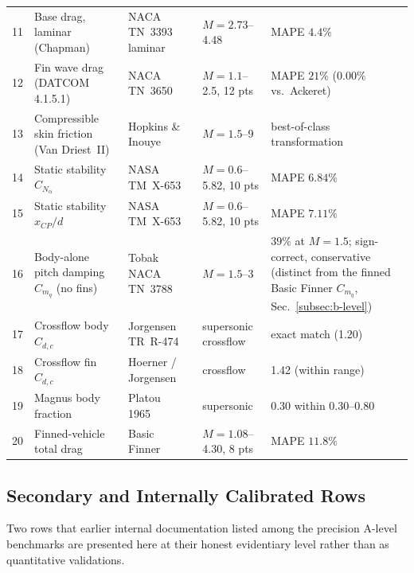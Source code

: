 \begin{table}[htbp]
\begin{tabular}{@{}r p{} p{} p{} p{}@{}}
11 & Base drag, laminar (Chapman)  & NACA TN~3393 laminar~\cite{chapman1955}           & $M = 2.73$--4.48           & MAPE $4.4\%$ \\
12 & Fin wave drag (DATCOM 4.1.5.1)& NACA TN~3650~\cite{ulmann1956}                    & $M = 1.1$--2.5, 12 pts     & MAPE $21\%$ ($0.00\%$ vs.\ Ackeret) \\
13 & Compressible skin friction (Van Driest~II) & Hopkins \& Inouye~\cite{hopkins1971} & $M = 1.5$--9        & best-of-class transformation \\
14 & Static stability $C_{N_\alpha}$ & NASA TM~X-653~\cite{nielsen1962}                & $M = 0.6$--5.82, 10 pts    & MAPE $6.84\%$ \\
15 & Static stability $x_{CP}/d$   & NASA TM~X-653~\cite{nielsen1962}                  & $M = 0.6$--5.82, 10 pts    & MAPE $7.11\%$ \\
16 & Body-alone pitch damping $C_{m_q}$ (no fins) & Tobak NACA TN~3788~\cite{tobak1956}               & $M = 1.5$--3               & $39\%$ at $M=1.5$; sign-correct, conservative (distinct from the finned Basic Finner $C_{m_q}$, Sec.~\ref{subsec:b-level}) \\
17 & Crossflow body $C_{d,c}$      & Jorgensen TR~R-474~\cite{jorgensen1977}           & supersonic crossflow       & exact match (1.20) \\
18 & Crossflow fin $C_{d,c}$       & Hoerner / Jorgensen~\cite{hoerner1965}            & crossflow                  & 1.42 (within range) \\
19 & Magnus body fraction          & Platou 1965~\cite{platou1965}                     & supersonic                 & 0.30 within $0.30$--$0.80$ \\
20 & Finned-vehicle total drag     & Basic Finner~\cite{dupuis1997}                    & $M = 1.08$--4.30, 8 pts    & MAPE $11.8\%$ \\
\bottomrule
\end{tabular}
\endgroup
\end{table}

\subsection{Secondary and Internally Calibrated Rows}
\label{subsec:secondary}

Two rows that earlier internal documentation listed among the precision A-level
benchmarks are presented here at their honest evidentiary level rather than as
quantitative validations.

